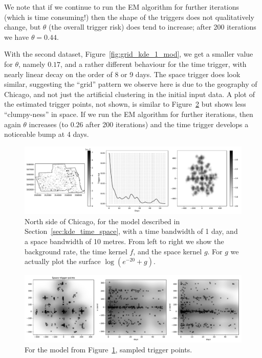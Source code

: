 \documentclass[twoside,a4paper]{article}
\theoremstyle{plain}
\theoremstyle{definition}
\begin{document}
We note that if we continue to run the EM algorithm for further iterations (which is time
consuming!) then the shape of the triggers does not qualitatively change, but $\theta$ (the
overall trigger risk) does tend to increase; after 200 iterations we have $\theta=0.44$.

With the second dataset, Figure~\ref{fig:grid_kde_1_mod},
we get a smaller value for $\theta$, namely $0.17$, and a rather different
behaviour for the time trigger, with nearly linear decay on the order of 8 or 9 days.  The space
trigger does look similar, suggesting the ``grid'' pattern we observe here is due to the geography
of Chicago, and not just the artificial clustering in the initial input data.
A plot of the estimated trigger points, not shown, is similar to Figure~\ref{fig:grid_kde_1a}
but shows less ``clumpy-ness'' in space.  If we run the EM algorithm for further iterations,
then again $\theta$ increases (to $0.26$ after 200 iterations) and the time trigger develops a
noticeable bump at 4 days.

\begin{figure}
  \includegraphics[width=\textwidth]{../notebooks/grid_kde_one.pdf}
  \caption{North side of Chicago, for the model described in Section~\ref{sec:kde_time_space},
  with a time bandwidth of 1 day, and a space bandwidth of 10 metres.  From left to right we show
  the background rate, the time kernel $f$, and the space kernel $g$.  For $g$ we actually plot
  the surface $\log(e^{-20}+g)$.}
  \label{fig:grid_kde_1}
\end{figure}

\begin{figure}
  \includegraphics[width=\textwidth]{../notebooks/grid_kde_onea.pdf}
  \caption{For the model from Figure~\ref{fig:grid_kde_1}, sampled trigger points.}
  \label{fig:grid_kde_1a}
\end{figure}
\end{document}
